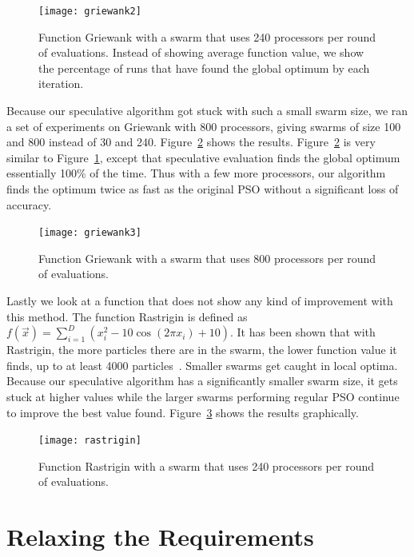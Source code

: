 \documentclass[journal,letterpaper]{IEEEtran}
\newcommand{\fig}[1]{Figure~\ref{fig:#1}}
\begin{document}
\begin{figure}
  \centering
  \texttt{[image: griewank2]}
  \caption{Function Griewank with a swarm that uses 240 processors per round of
  evaluations.  Instead of showing average function value, we show the
  percentage of runs that have found the global optimum by each iteration.}
  \label{fig:basic-griewank2}
\end{figure}

Because our speculative algorithm got stuck with such a small swarm size, we
ran a set of experiments on Griewank with 800 processors, giving swarms of size
100 and 800 instead of 30 and 240.  \fig{basic-griewank3} shows the results.
\fig{basic-griewank3} is very similar to \fig{basic-griewank2}, except that
speculative evaluation finds the global optimum essentially 100\% of the time.
Thus with a few more processors, our algorithm finds the optimum twice as fast
as the original PSO without a significant loss of accuracy.

\begin{figure}
  \centering
  \texttt{[image: griewank3]}
  \caption{Function Griewank with a swarm that uses 800 processors per round of
  evaluations.}
  \label{fig:basic-griewank3}
\end{figure}

Lastly we look at a function that does not show any kind of improvement with
this method.  The function Rastrigin is defined as $f(\Vec{x}) = \sum_{i=1}^D
\left(x_i^2 - 10\cos\left(2\pi x_i\right) + 10\right)$.  It has been shown that
with Rastrigin, the more particles there are in the swarm, the lower function
value it finds, up to at least 4000 particles~\cite{mcnabb-cec09}.  Smaller
swarms get caught in local optima.  Because our speculative algorithm has a
significantly smaller swarm size, it gets stuck at higher values while the
larger swarms performing regular PSO continue to improve the best value found.
\fig{rastrigin} shows the results graphically.

\begin{figure}
  \centering
  \texttt{[image: rastrigin]}
  \caption{Function Rastrigin with a swarm that uses 240 processors per round
  of evaluations.}
  \label{fig:rastrigin}
\end{figure}

\section{Relaxing the Requirements}
\label{sec:relax}
\end{document}
